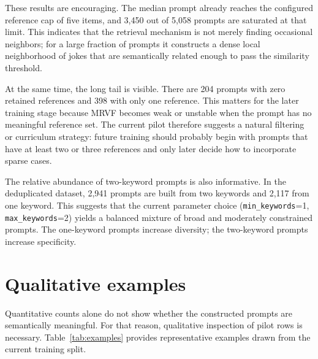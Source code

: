 \documentclass[14pt,a4paper]{extreport}
\begin{document}
These results are encouraging. The median prompt already reaches the configured reference cap of five items, and 3{,}450 out of 5{,}058 prompts are saturated at that limit. This indicates that the retrieval mechanism is not merely finding occasional neighbors; for a large fraction of prompts it constructs a dense local neighborhood of jokes that are semantically related enough to pass the similarity threshold.

At the same time, the long tail is visible. There are 204 prompts with zero retained references and 398 with only one reference. This matters for the later training stage because MRVF becomes weak or unstable when the prompt has no meaningful reference set. The current pilot therefore suggests a natural filtering or curriculum strategy: future training should probably begin with prompts that have at least two or three references and only later decide how to incorporate sparse cases.

The relative abundance of two-keyword prompts is also informative. In the deduplicated dataset, 2{,}941 prompts are built from two keywords and 2{,}117 from one keyword. This suggests that the current parameter choice (\texttt{min\_keywords}=1, \texttt{max\_keywords}=2) yields a balanced mixture of broad and moderately constrained prompts. The one-keyword prompts increase diversity; the two-keyword prompts increase specificity.

\section{Qualitative examples}

Quantitative counts alone do not show whether the constructed prompts are semantically meaningful. For that reason, qualitative inspection of pilot rows is necessary. Table~\ref{tab:examples} provides representative examples drawn from the current training split.
\end{document}
